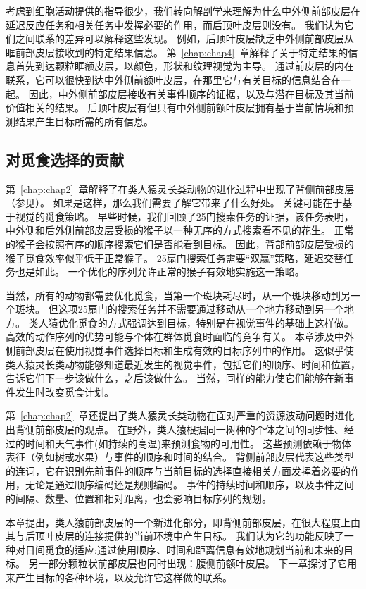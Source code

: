 考虑到细胞活动提供的指导很少，我们转向解剖学来理解为什么中外侧前部皮层在延迟反应任务和相关任务中发挥必要的作用，而后顶叶皮层则没有。
我们认为它们之间联系的差异可以解释这些发现。
例如，后顶叶皮层缺乏中外侧前部皮层从眶前部皮层接收到的特定结果信息。
第~\ref{chap:chap4}~章解释了关于特定结果的信息首先到达颗粒眶额皮层，以颜色，形状和纹理视觉为主导。
通过前皮层的内在联系，它可以很快到达中外侧前额叶皮层，在那里它与有关目标的信息结合在一起。
因此，中外侧前部皮层接收有关事件顺序的证据，以及与潜在目标及其当前价值相关的结果。
后顶叶皮层有但只有中外侧前额叶皮层拥有基于当前情境和预测结果产生目标所需的所有信息。



\subsection{对觅食选择的贡献}

第~\ref{chap:chap2}~章解释了在类人猿灵长类动物的进化过程中出现了背侧前部皮层（参见\cite{preuss2011human}）。
如果是这样，那么我们需要了解它带来了什么好处。
关键可能在于基于视觉的觅食策略。
早些时候，我们回顾了25门搜索任务的证据，该任务表明，中外侧和后外侧前部皮层受损的猴子以一种无序的方式搜索看不见的花生\cite{passingham1985memory}。
正常的猴子会按照有序的顺序搜索它们是否能看到目标\cite{desrochers2010optimal,taffe2011rhesus}。
因此，背部前部皮层受损的猴子觅食效率似乎低于正常猴子。
25扇门搜索任务需要“双赢”策略，延迟交替任务也是如此。
一个优化的序列允许正常的猴子有效地实施这一策略。


当然，所有的动物都需要优化觅食，当第一个斑块耗尽时，从一个斑块移动到另一个斑块\cite{plank2008optimal}。
但这项25扇门的搜索任务并不需要通过移动从一个地方移动到另一个地方。
类人猿优化觅食的方式强调达到目标，特别是在视觉事件的基础上这样做。
高效的动作序列的优势可能与个体在群体觅食时面临的竞争有关。
本章涉及中外侧前部皮层在使用视觉事件选择目标和生成有效的目标序列中的作用。
这似乎使类人猿灵长类动物能够知道最近发生的视觉事件，包括它们的顺序、时间和位置，告诉它们下一步该做什么，之后该做什么。
当然，同样的能力使它们能够在新事件发生时改变觅食计划。


第~\ref{chap:chap2}~章还提出了类人猿灵长类动物在面对严重的资源波动问题时进化出背侧前部皮层的观点。
在野外，类人猿根据同一树种的个体之间的同步性、经过的时间和天气事件(如持续的高温)来预测食物的可用性。
这些预测依赖于物体表征（例如树或水果）与事件的顺序和时间的结合。
背侧前部皮层代表这些类型的连词，它在识别先前事件的顺序与当前目标的选择直接相关方面发挥着必要的作用，无论是通过顺序编码还是规则编码。
事件的持续时间和顺序，以及事件之间的间隔、数量、位置和相对距离，也会影响目标序列的规划。


本章提出，类人猿前部皮层的一个新进化部分，即背侧前部皮层，在很大程度上由其与后顶叶皮层的连接提供的当前环境中产生目标。
我们认为它的功能反映了一种对日间觅食的适应:通过使用顺序、时间和距离信息有效地规划当前和未来的目标。
另一部分颗粒状前部皮层也同时出现：腹侧前额叶皮层。
下一章探讨了它用来产生目标的各种环境，以及允许它这样做的联系。

